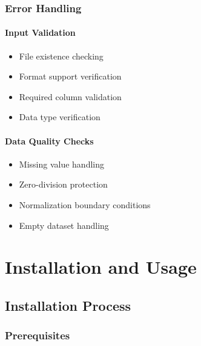 \documentclass[
  11pt,
]{article}
\newenvironment{Shaded}{\begin{snugshade}}{\end{snugshade}}
\newcommand{\AttributeTok}[1]{\textcolor[rgb]{0.13,0.29,0.53}{#1}}
\newcommand{\CommentTok}[1]{\textcolor[rgb]{0.56,0.35,0.01}{\textit{#1}}}
\newcommand{\ConstantTok}[1]{\textcolor[rgb]{0.56,0.35,0.01}{#1}}
\newcommand{\ControlFlowTok}[1]{\textcolor[rgb]{0.13,0.29,0.53}{\textbf{#1}}}
\newcommand{\DecValTok}[1]{\textcolor[rgb]{0.00,0.00,0.81}{#1}}
\newcommand{\FunctionTok}[1]{\textcolor[rgb]{0.13,0.29,0.53}{\textbf{#1}}}
\newcommand{\NormalTok}[1]{#1}
\newcommand{\SpecialCharTok}[1]{\textcolor[rgb]{0.81,0.36,0.00}{\textbf{#1}}}
\newcommand{\StringTok}[1]{\textcolor[rgb]{0.31,0.60,0.02}{#1}}
\providecommand{\tightlist}{%
  \setlength{\itemsep}{0pt}\setlength{\parskip}{0pt}}
\begin{document}
\subsubsection{Error Handling}\label{error-handling}

\paragraph{Input Validation}\label{input-validation}

\begin{itemize}
\tightlist
\item
  File existence checking
\item
  Format support verification
\item
  Required column validation
\item
  Data type verification
\end{itemize}

\paragraph{Data Quality Checks}\label{data-quality-checks}

\begin{itemize}
\tightlist
\item
  Missing value handling
\item
  Zero-division protection
\item
  Normalization boundary conditions
\item
  Empty dataset handling
\end{itemize}

\newpage

\section{Installation and Usage}\label{installation-and-usage}

\subsection{Installation Process}\label{installation-process}

\subsubsection{Prerequisites}\label{prerequisites}

\begin{Shaded}
\end{Shaded}
\end{document}
